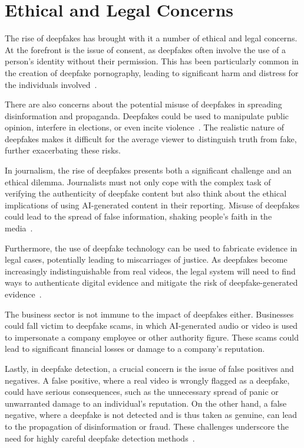 \section{Ethical and Legal Concerns}\label{chapter:legal}
The rise of deepfakes has brought with it a number of ethical and legal concerns.
At the forefront is the issue of consent, as deepfakes often involve the
use of a person's identity without their permission. This has been
particularly common in the creation of deepfake pornography, leading
to significant harm and distress for the individuals involved~\cite{chesney2019deep}.

There are also concerns about the potential misuse of deepfakes in spreading
disinformation and propaganda. Deepfakes could be used to manipulate public
opinion, interfere in elections, or even incite violence~\cite{deepfakes-business-insider,partnershiponai}.
The realistic nature of deepfakes makes it difficult for the average viewer
to distinguish truth from fake, further exacerbating these risks.

In journalism, the rise of deepfakes presents both a significant
challenge and an ethical dilemma. Journalists must not only cope with
the complex task of verifying the authenticity of deepfake content
but also think about the ethical implications of using \ac{AI}-generated
content in their reporting. Misuse of deepfakes could lead to the spread of
false information, shaking people's faith in the media~\cite{doi:10.1177/2056305120903408}.

Furthermore, the use of deepfake technology can be used to fabricate evidence in
legal cases, potentially leading to miscarriages of justice. As deepfakes become
increasingly indistinguishable from real videos, the legal system will need to
find ways to authenticate digital evidence and mitigate the risk of deepfake-generated
evidence~\cite{chesney2019deep}.

The business sector is not immune to the impact of deepfakes either. Businesses
could fall victim to deepfake scams, in which \ac{AI}-generated audio or video
is used to impersonate a company employee or other authority figure.
These scams could lead to significant financial losses or damage to a
company's reputation.

Lastly, in deepfake detection, a crucial concern is the issue of
false positives and negatives. A false positive, where a real video is wrongly
flagged as a deepfake, could have serious consequences, such as the unnecessary
spread of panic or unwarranted damage to an individual's reputation. On the
other hand, a false negative, where a deepfake is not detected and is thus
taken as genuine, can lead to the propagation of disinformation or fraud.
These challenges underscore the need for highly careful deepfake detection methods~\cite{roessler2019faceforensicspp}.

